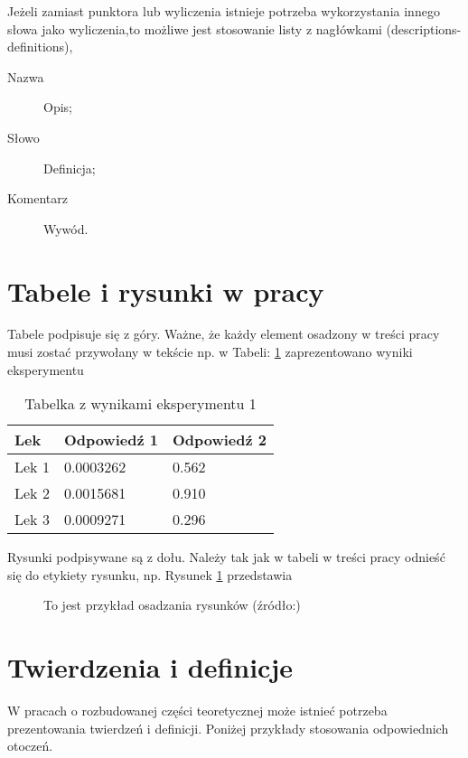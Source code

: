 Jeżeli zamiast punktora lub wyliczenia istnieje potrzeba wykorzystania innego słowa jako wyliczenia,to możliwe jest stosowanie listy z nagłówkami (descriptions-definitions),
\begin{description}
\item[Nazwa] Opis;
\item[Słowo] Definicja;
\item[Komentarz] Wywód.
\end{description}

\section{Tabele i rysunki w pracy}

Tabele podpisuje się z góry. Ważne, że każdy element osadzony w treści pracy musi zostać przywołany w tekście np. w Tabeli: \ref{tab:eksperyment1} zaprezentowano wyniki eksperymentu

\begin{table}[h]
\centering
\caption{Tabelka z wynikami eksperymentu 1} 
\begin{tabular}{l l l}
\toprule
\textbf{Lek} & \textbf{Odpowiedź 1} & \textbf{Odpowiedź 2}\\
\midrule
Lek 1 & 0.0003262 & 0.562 \\
Lek 2 & 0.0015681 & 0.910 \\
Lek 3 & 0.0009271 & 0.296 \\
\bottomrule
\end{tabular}
\label{tab:eksperyment1} %
\end{table}

Rysunki podpisywane są z dołu. Należy tak jak w tabeli w treści pracy odnieść się do etykiety rysunku, np. Rysunek \ref{fig:rys1} przedstawia

\begin{figure}[!ht]
		\centering
		\caption{To jest przykład osadzania rysunków (źródło:)}
		\label{fig:rys1}
\end{figure}



\section{Twierdzenia i definicje}

W pracach o rozbudowanej części teoretycznej może istnieć potrzeba prezentowania twierdzeń i definicji. Poniżej przykłady stosowania odpowiednich otoczeń. 

